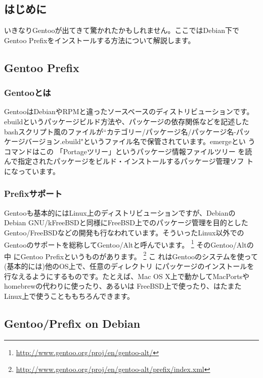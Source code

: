 \documentclass[mingoth,a4paper]{jsarticle}
\begin{document}
\clearpage
\newpage

\label{sec:gentoo}

\subsection{はじめに}

いきなりGentooが出てきて驚かれたかもしれません。ここではDebian下で
Gentoo Prefixをインストールする方法について解説します。

\subsection{Gentoo Prefix}
\subsubsection{Gentooとは}
GentooはDebianやRPMと違ったソースベースのディストリビューションです。
ebuildというパッケージビルド方法や、パッケージの依存関係などを記述した
bashスクリプト風のファイルが``カテゴリー/パッケージ名/パッケージ名-パッ
ケージバージョン.ebuild"というファイル名で保管されています。emergeとい
うコマンドはこの 「Portageツリー」というパッケージ情報ファイルツリー
を読んで指定されたパッケージをビルド・インストールするパッケージ管理ソフ
トになっています。

\subsubsection{Prefixサポート}

Gentooも基本的にはLinux上のディストリビューションですが、Debianの
Debian GNU/kFreeBSDと同様にFreeBSD上でのパッケージ管理を目的とした
Gentoo/FreeBSDなどの開発も行なわれています。そういったLinux以外での
Gentooのサポートを総称してGentoo/Altと呼んでいます。
\footnote{\url{http://www.gentoo.org/proj/en/gentoo-alt/}} そのGentoo/Altの中
にGentoo Prefixというものがあります。
\footnote{\url{http://www.gentoo.org/proj/en/gentoo-alt/prefix/index.xml}} こ
れはGentooのシステムを使って(基本的には)他のOS上で、任意のディレクトリ
にパッケージのインストールを行なえるようにするものです。たとえば、Mac
OS X上で動かしてMacPortsやhomebrewの代わりに使ったり、あるいは
FreeBSD上で使ったり、はたまたLinux上で使うことももちろんできます。

\subsection{Gentoo/Prefix on Debian}
\end{document}
